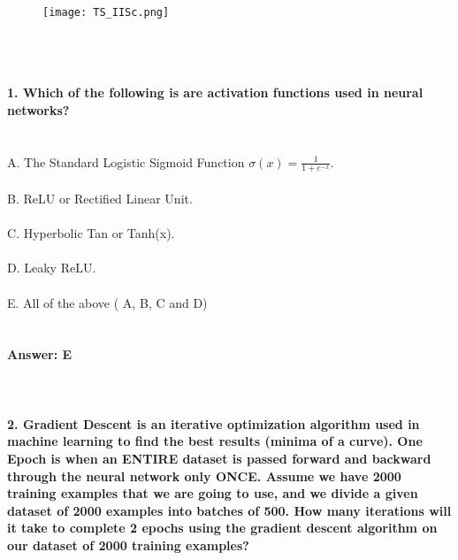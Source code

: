 \documentclass[prl,twocolumn,showpacs,preprintnumbers,superscriptaddress]{revtex4}
\theoremstyle{plain}
\theoremstyle{definition}
\begin{document}
\begin{widetext}
\\
\\
\\

\begin{wrapfigure}
\centering
\end{wrapfigure}
\begin{figure}[h!]
 \begin{right}
  \hfill\texttt{[image: TS\_IISc.png]}
 \end{right}
\end{figure}
\\
\\
\\
\noindent\textbf{1. Which of the following is are activation functions used in neural networks?}
\\
\\
\\
\noindent A. The Standard Logistic Sigmoid Function $\sigma(x) = \frac{1}{1 + e^{-x}}$.
\\
\\
B. ReLU or Rectified Linear Unit. 
\\
\\
C. Hyperbolic Tan or Tanh(x).
\\
\\
D. Leaky ReLU.
\\
\\
E. All of the above ( A, B, C and D)
\\
\\
\\
\textbf{Answer: E}
\\
\\
\\
\\
\textbf{2. Gradient Descent is an iterative optimization algorithm used in machine learning to find the best results (minima of a curve). One Epoch is when an ENTIRE dataset is passed forward and backward through the neural network only ONCE. Assume we have 2000 training examples that we are going to use, and we divide a given dataset of 2000 examples into batches of 500. How many iterations will it take to complete 2 epochs using the gradient descent algorithm on our dataset of 2000 training examples?}

\end{widetext}
\end{document}
